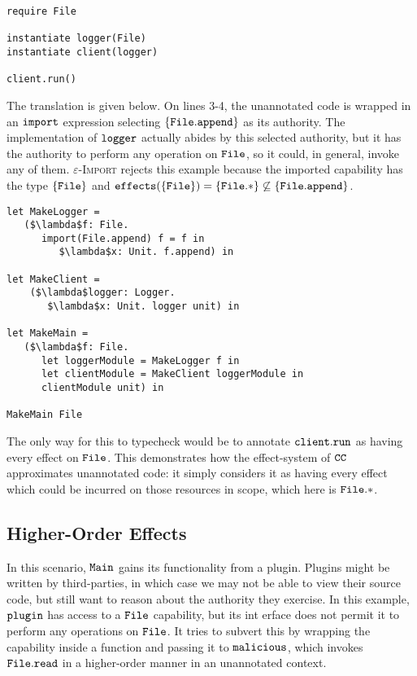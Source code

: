 \begin{lstlisting}
require File

instantiate logger(File)
instantiate client(logger)

client.run()
\end{lstlisting}

The translation is given below. On lines 3-4, the unannotated code is wrapped in an $\mathtt{import}$ expression selecting $\{ \mathtt{File.append} \}$ as its authority. The implementation of $\mathtt{logger}$ actually abides by this selected authority, but it has the authority to perform any operation on $\mathtt{File}$, so it could, in general, invoke any of them. \textsc{$\varepsilon$-Import} rejects this example because the imported capability has the type $\{ \mathtt{File} \}$ and $\mathtt{effects}(\{ \mathtt{File} \}) = \{ \mathtt{File}.* \} \not\subseteq \{ \mathtt{ File.append } \}$.

\begin{lstlisting}
let MakeLogger =
   ($\lambda$f: File.
      import(File.append) f = f in
         $\lambda$x: Unit. f.append) in

let MakeClient =
	($\lambda$logger: Logger.
	   $\lambda$x: Unit. logger unit) in

let MakeMain =
   ($\lambda$f: File.
      let loggerModule = MakeLogger f in
      let clientModule = MakeClient loggerModule in
      clientModule unit) in

MakeMain File
\end{lstlisting}

The only way for this to typecheck would be to annotate $\mathtt{client.run}$ as having every effect on $\mathtt{File}$. This demonstrates how the effect-system of $\mathtt{CC}$ approximates unannotated code: it simply considers it as having every effect which could be incurred on those resources in scope, which here is $\mathtt{File}.*$.


\subsection{Higher-Order Effects}

In this scenario, $\mathtt{Main}$ gains its functionality from a plugin. Plugins might be written by third-parties, in which case we may not be able to view their source code, but still want to reason about the authority they exercise. In this example, $\mathtt{plugin}$ has access to a $\mathtt{File}$ capability, but its int erface does not permit it to perform any operations on $\mathtt{File}$. It tries to subvert this by wrapping the capability inside a function and passing it to $\mathtt{malicious}$, which invokes $\mathtt{File.read}$ in a higher-order manner in an unannotated context.


